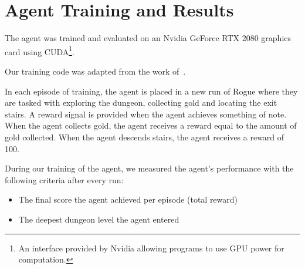 \documentclass[12pt,a4paper]{article}
\begin{document}
    \section{Agent Training and Results}\label{sec:agent-training-and-results}
    The agent was trained and evaluated on an Nvidia GeForce RTX 2080 graphics card using CUDA\footnote{An interface provided by Nvidia allowing programs to use GPU power for computation.}.

    Our training code was adapted from the work of~\citet{sebtheiler}.

    In each episode of training, the agent is placed in a new run of Rogue where they are tasked with exploring the dungeon, collecting gold and locating the exit stairs.
    A reward signal is provided when the agent achieves something of note.
    When the agent collects gold, the agent receives a reward equal to the amount of gold collected.
    When the agent descends stairs, the agent receives a reward of 100.

    During our training of the agent, we measured the agent's performance with the following criteria after every run:

    \begin{itemize}
        \item The final score the agent achieved per episode (total reward)
        \item The deepest dungeon level the agent entered
    \end{itemize}
\end{document}
